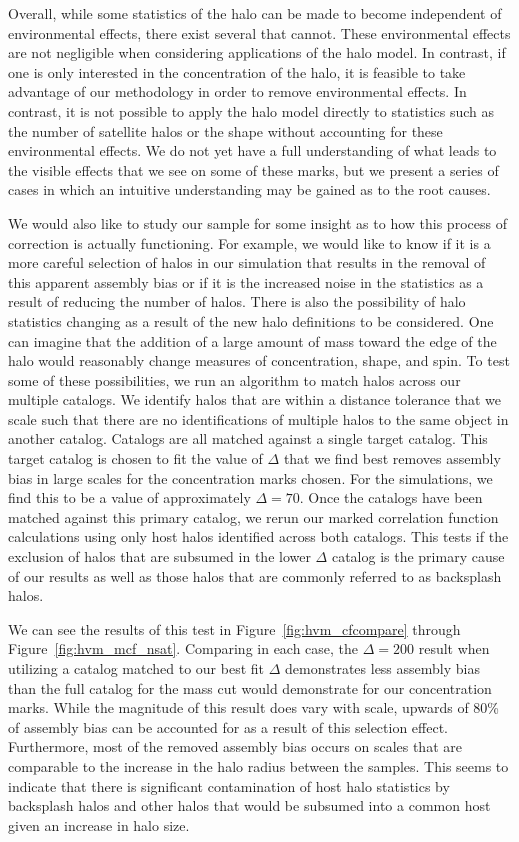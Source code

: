 \documentclass[usenatbib,usegraphicx,letterpaper]{mn2e}
\begin{document}
Overall, while some statistics of the halo can be made to become independent of environmental effects, there exist several that cannot. These environmental effects are not negligible when considering applications of the halo model. In contrast, if one is only interested in the concentration of the halo, it is feasible to take advantage of our methodology in order to remove environmental effects. In contrast, it is not possible to apply the halo model directly to statistics such as the number of satellite halos or the shape without accounting for these environmental effects. We do not yet have a full understanding of what leads to the visible effects that we see on some of these marks, but we present a series of cases in which an intuitive understanding may be gained as to the root causes.

We would also like to study our sample for some insight as to how this process of correction is actually functioning. For example, we would like to know if it is a more careful selection of halos in our simulation that results in the removal of this apparent assembly bias or if it is the increased noise in the statistics as a result of reducing the number of halos. There is also the possibility of halo statistics changing as a result of the new halo definitions to be considered. One can imagine that the addition of a large amount of mass toward the edge of the halo would reasonably change measures of concentration, shape, and spin. To test some of these possibilities, we run an algorithm to match halos across our multiple catalogs. We identify halos that are within a distance tolerance that we scale such that there are no identifications of multiple halos to the same object in another catalog. Catalogs are all matched against a single target catalog. This target catalog is chosen to fit the value of $\Delta$ that we find best removes assembly bias in large scales for the concentration marks chosen. For the \citet{diemer15} simulations, we find this to be a value of approximately $\Delta = 70$. Once the catalogs have been matched against this primary catalog, we rerun our marked correlation function calculations using only host halos identified across both catalogs. This tests if the exclusion of halos that are subsumed in the lower $\Delta$ catalog is the primary cause of our results as well as those halos that are commonly referred to as backsplash halos.

We can see the results of this test in Figure~\ref{fig:hvm_cfcompare} through Figure~\ref{fig:hvm_mcf_nsat}. Comparing in each case, the $\Delta = 200$ result when utilizing a catalog matched to our best fit $\Delta$ demonstrates less assembly bias than the full catalog for the mass cut would demonstrate for our concentration marks. While the magnitude of this result does vary with scale, upwards of 80\% of assembly bias can be accounted for as a result of this selection effect. Furthermore, most of the removed assembly bias occurs on scales that are comparable to the increase in the halo radius between the samples. This seems to indicate that there is significant contamination of host halo statistics by backsplash halos and other halos that would be subsumed into a common host given an increase in halo size.
\end{document}
